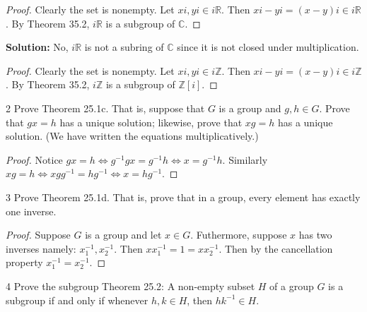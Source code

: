 \begin{proof}
    Clearly the set is nonempty.
    Let $xi, yi \in i\mathbb{R}$.
    Then $xi - yi = (x - y)i \in i\mathbb{R}$.
    By Theorem 35.2, $i\mathbb{R}$ is a subgroup of $\mathbb{C}$.
\end{proof}

\textbf{Solution:} No, $i\mathbb{R}$ is not a subring of $\mathbb{C}$ since it is 
not closed under multiplication.

\begin{proof}
    Clearly the set is nonempty.
    Let $xi, yi \in i\mathbb{Z}$.
    Then $xi - yi = (x - y)i \in i\mathbb{Z}$.
    By Theorem 35.2, $i\mathbb{Z}$ is a subgroup of $\mathbb{Z}[i]$.
\end{proof}

\begin{problem}{2}
    Prove Theorem 25.1c. That is, suppose that $G$ 
    is a group and $g, h \in G$. Prove that $gx = h$
    has a unique solution; likewise, prove that 
    $xg = h$ has a unique solution. (We have 
    written the equations multiplicatively.)
\end{problem}
\solved

\begin{proof}
    Notice $gx = h \iff g^{-1}gx = g^{-1}h \iff x = g^{-1}h$.
    Similarly $xg = h \iff xgg^{-1} = hg^{-1} \iff x = h g^{-1}$.
\end{proof}

\begin{problem}{3}
    Prove Theorem 25.1d. That is, prove that in a group,
    every element has exactly one inverse.
\end{problem}
\solved

\begin{proof}
    Suppose $G$ is a group and let $x \in G$.
    Futhermore, suppose $x$ has two inverses namely: $x^{-1}_1, x^{-1}_2$.
    Then $x x^{-1}_1 = 1 = x x^{-1}_2$.
    Then by the cancellation property $x^{-1}_1 = x^{-1}_2$.
\end{proof}

\begin{problem}{4}
    Prove the subgroup Theorem 25.2: A non-empty subset $H$ of a group $G$
    is a subgroup if and only if whenever $h, k \in H$, then $h k^{-1} \in H$.
\end{problem}
\solved


